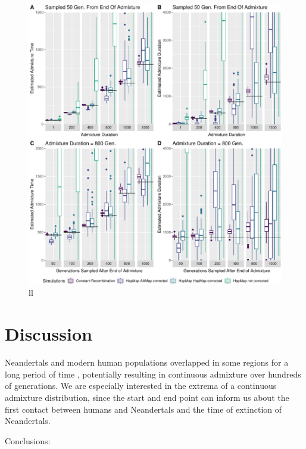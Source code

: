 \documentclass[]{article}
\begin{document}
\begin{figure}
\centering
\includegraphics{Admixture_Time_Inference_Paper_Draft_files/figure-latex/fig4-1.pdf}
\caption{\label{fig:fig4} ll}
\end{figure}

\section{Discussion}\label{discussion}

Neandertals and modern human populations overlapped in some regions for
a long period of time \citep{higham_timing_2014}, potentially resulting
in continuous admixture over hundreds of generations. We are especially
interested in the extrema of a continuous admixture distribution, since
the start and end point can inform us about the first contact between
humans and Neandertals and the time of extinction of Neandertals.

Conclusions:
\end{document}

